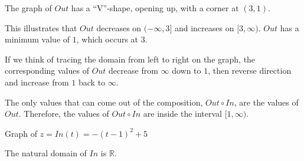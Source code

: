 \documentclass{ximera}
\begin{document}
The graph of $Out$ has a ``V''-shape, opening up, with a corner at $(3,1)$. 

This illustrates that $Out$ decreases on $(-\infty, 3]$ and increases on $[3, \infty)$.  $Out$ has a minimum value of $1$, which occurs at $3$. 

If we think of tracing the domain from left to right on the graph, the corresponding values of $Out$ decrease from $\infty$ down to $1$, then reverse direction and increase from $1$ back to $\infty$. 



The only values that can come out of the composition, $Out \circ In$, are the values of $Out$. Therefore, the values of $Out \circ In$ are inside the interval $[1, \infty)$.  



Graph of $z = In(t) = -(t-1)^2 + 5$





\begin{image}
\end{image}
The natural domain of $In$ is $\mathbb{R}$. 
\end{document}
